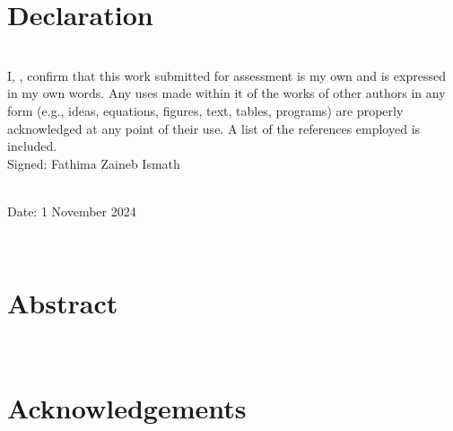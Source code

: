 \cleardoublepage

\thispagestyle{plain}

\vspace*{3cm}
\section*{Declaration}

~\\

\noindent I, \docAuthor, confirm that this work submitted for assessment is my own and is expressed in my
own words. Any uses made within it of the works of other authors in any form (e.g., ideas, equations,
figures, text, tables, programs) are properly acknowledged at any point of their use. A list of the
references employed is included.\\

\noindent Signed: Fathima Zaineb Ismath

~\\

\noindent Date:  1 November 2024

~\\

\cleardoublepage


\thispagestyle{plain}

\vspace*{3cm} %
\section*{Abstract} %

~\\

\noindent

\cleardoublepage

\thispagestyle{plain}

\vspace*{3cm}
\section*{Acknowledgements}

